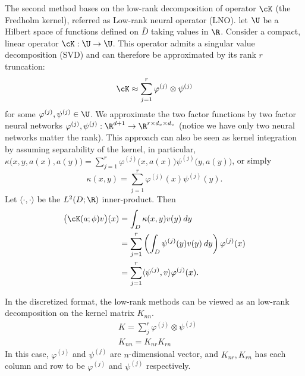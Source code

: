 


\iffalse
The second method bases on the low-rank decomposition of operator $\cK$ (the Fredholm kernel), referred as Low-rank neural operator (LNO).
let \(\U\) be a Hilbert space of functions defined on \(\bar{D}\) taking values in \(\R\). Consider a compact, linear operator \(\cK: \U \to \U\).
This operator admits a singular value decomposition (SVD) and can therefore be approximated by its rank \(r\) truncation:
\[\cK \approx \sum_{j=1}^r \varphi^{(j)} \otimes \psi^{(j)}\]
for some \(\varphi^{(j)}, \psi^{(j)} \in \U\).  
We approximate the two factor functions by two factor neural networks $\varphi^{(j)}, \psi^{(j)}: \R^{d+1} \to \R^{r \times d_v \times d_v}$ (notice we have only two neural networks matter the rank).
This approach can also be seen as kernel integration by assuming separability of the kernel, in particular,
$\kappa\big(x,y, a(x), a(y)\big) = \sum_{j=1}^r \varphi^{(j)}\big(x, a(x)\big) \psi^{(j)}\big(y, a(y)\big)$, or simply
\[\kappa(x,y) = \sum_{j=1}^r \varphi^{(j)}(x) \psi^{(j)}(y).\]
Let \(\langle \cdot, \cdot \rangle\) be the \(L^2(D;\R)\) inner-product. Then
\begin{align*}
\bigl(\cK(a;\phi)v\bigr)(x) &= \int_D \kappa(x,y) v(y) \: dy \\
   &= \sum_{j=1}^r \left ( \int_D \psi^{(j)}(y) v(y) \: dy \right ) \varphi^{(j)}(x) \\
   & = \sum_{j=1}^r \langle \psi^{(j)}, v \rangle \varphi^{(j)}(x). 
\end{align*}

In the discretized format, the low-rank methods can be viewed as an low-rank decomposition on the kernel matrix $K_{nn}$.
\begin{align*}
    &K = \sum_j^r \varphi^{(j)} \otimes \psi^{(j)}\\
    &K_{nn} = K_{nr} K_{rn}
\end{align*}
In this case, $\varphi^{(j)}$ and $\psi^{(j)}$ are $n$-dimensional vector, and $K_{nr}, K_{rn}$ has each column and row to be $\varphi^{(j)}$ and $\psi^{(j)}$ respectively.


